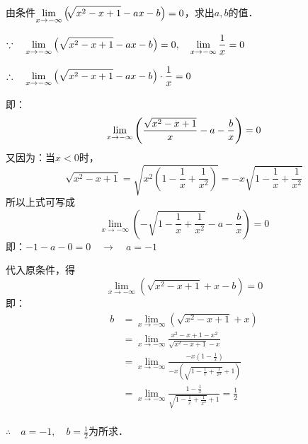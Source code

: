 \begin{example}
由条件$\displaystyle\lim_{x\to -\infty}\left(\sqrt[]{x^2-x+1}-ax-b\right)=0$，求出$a,b$的值．
\end{example}

\begin{solution}
$\because\quad \displaystyle\lim_{x\to -\infty}\left(\sqrt{x^2-x+1}-ax-b\right)=0,\quad \displaystyle\lim_{x\to -\infty}\dfrac{1}{x}=0$

$\therefore\quad \displaystyle\lim_{x\to -\infty}\left(\sqrt{x^2-x+1}-ax-b\right)\cdot \dfrac{1}{x}=0$

即：
\[\displaystyle\lim_{x\to -\infty}\left(\dfrac{\sqrt{x^2-x+1}}{x}-a-\dfrac{b}{x}\right)=0\]
又因为：当$x<0$时，
\[\sqrt{x^2-x+1}=\sqrt{x^2\left(1-\frac{1}{x}+\frac{1}{x^2}\right)}=-x\sqrt{1-\frac{1}{x}+\frac{1}{x^2}}\]
所以上式可写成
\[\lim_{x\to -\infty}\left(-\sqrt{1-\frac{1}{x}+\frac{1}{x^2}}-a-\frac{b}{x}\right)=0\]
即：$-1-a-0=0\quad \to \quad a=-1$

代入原条件，得
\[\lim_{x\to -\infty}\left(\sqrt{x^2-x+1}+x-b\right)=0\]
即：
\[\begin{split}
    b&=\lim_{x\to-\infty}\left(\sqrt{x^2-x+1}+x\right)\\
    &=\lim_{x\to-\infty} \frac{x^2-x+1-x^2}{\sqrt{x^2-x+1}-x}  \\
    &=\lim_{x\to-\infty}\frac{-x\left(1-\frac{1}{x}\right)}{-x\left(\sqrt{1-\frac{1}{x}+\frac{1}{x^2}}+1\right)}    \\
    &=\lim_{x\to-\infty}\frac{1-\frac{1}{x}}{\sqrt{1-\frac{1}{x}+\frac{1}{x^2}}+1} =\frac{1}{2}   \\
\end{split}\]

$\therefore\quad a=-1,\quad b=\frac{1}{2}$为所求．
\end{solution}

